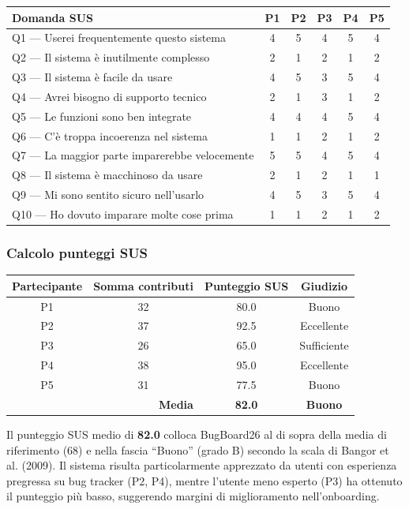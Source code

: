 ﻿\documentclass[a4paper,11pt]{article}
\begin{document}
\begin{tabular}{|l|c|c|c|c|c|}
\hline
\textbf{Domanda SUS} & \textbf{P1} & \textbf{P2} & \textbf{P3} & \textbf{P4} & \textbf{P5} \\
\hline
Q1 --- Userei frequentemente questo sistema & 4 & 5 & 4 & 5 & 4 \\
\hline
Q2 --- Il sistema \`e inutilmente complesso & 2 & 1 & 2 & 1 & 2 \\
\hline
Q3 --- Il sistema \`e facile da usare & 4 & 5 & 3 & 5 & 4 \\
\hline
Q4 --- Avrei bisogno di supporto tecnico & 2 & 1 & 3 & 1 & 2 \\
\hline
Q5 --- Le funzioni sono ben integrate & 4 & 4 & 4 & 5 & 4 \\
\hline
Q6 --- C'\`e troppa incoerenza nel sistema & 1 & 1 & 2 & 1 & 2 \\
\hline
Q7 --- La maggior parte imparerebbe velocemente & 5 & 5 & 4 & 5 & 4 \\
\hline
Q8 --- Il sistema \`e macchinoso da usare & 2 & 1 & 2 & 1 & 1 \\
\hline
Q9 --- Mi sono sentito sicuro nell'usarlo & 4 & 5 & 3 & 5 & 4 \\
\hline
Q10 --- Ho dovuto imparare molte cose prima & 1 & 1 & 2 & 1 & 2 \\
\hline
\end{tabular}

\subsubsection{Calcolo punteggi SUS}

\begin{tabular}{|c|c|c|c|}
\hline
\textbf{Partecipante} & \textbf{Somma contributi} & \textbf{Punteggio SUS} & \textbf{Giudizio} \\
\hline
P1 & 32 & 80.0 & Buono \\
\hline
P2 & 37 & 92.5 & Eccellente \\
\hline
P3 & 26 & 65.0 & Sufficiente \\
\hline
P4 & 38 & 95.0 & Eccellente \\
\hline
P5 & 31 & 77.5 & Buono \\
\hline
\multicolumn{2}{|r|}{\textbf{Media}} & \textbf{82.0} & \textbf{Buono} \\
\hline
\end{tabular}

\vspace{0.3cm}
\noindent Il punteggio SUS medio di \textbf{82.0} colloca BugBoard26 al di sopra della media di riferimento (68) e nella fascia ``Buono'' (grado B) secondo la scala di Bangor et al. (2009). Il sistema risulta particolarmente apprezzato da utenti con esperienza pregressa su bug tracker (P2, P4), mentre l'utente meno esperto (P3) ha ottenuto il punteggio pi\`u basso, suggerendo margini di miglioramento nell'onboarding.
\end{document}
